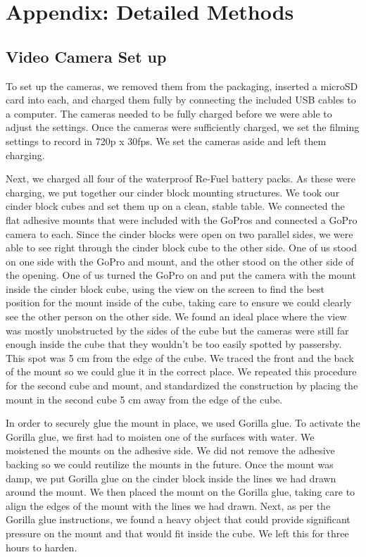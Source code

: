 \documentclass{article}\usepackage[]{graphicx}\usepackage[]{color}
\begin{document}



\newpage
\section{Appendix: Detailed Methods}

\subsection{Video Camera Set up}

To set up the cameras, we removed them from the packaging, inserted a microSD card into each, and charged them fully by connecting the included USB cables to a computer. The cameras needed to be fully charged before we were able to adjust the settings. Once the cameras were sufficiently charged, we set the filming settings to record in 720p x 30fps. We set the cameras aside and left them charging. 

Next, we charged all four of the waterproof Re-Fuel battery packs. As these were charging, we put together our cinder block mounting structures. We took our cinder block cubes and set them up on a clean, stable table. We connected the flat adhesive mounts that were included with the GoPros and connected a GoPro camera to each. Since the cinder blocks were open on two parallel sides, we were able to see right through the cinder block cube to the other side. One of us stood on one side with the GoPro and mount, and the other stood on the other side of the opening. One of us turned the GoPro on and put the camera with the mount inside the cinder block cube, using the view on the screen to find the best position for the mount inside of the cube, taking care to ensure we could clearly see the other person on the other side. We found an ideal place where the view was mostly unobstructed by the sides of the cube but the cameras were still far enough inside the cube that they wouldn't be too easily spotted by passersby. This spot was 5 cm from the edge of the cube. We traced the front and the back of the mount so we could glue it in the correct place. We repeated this procedure for the second cube and mount, and standardized the construction by placing the mount in the second cube 5 cm away from the edge of the cube. 

In order to securely glue the mount in place, we used Gorilla glue. To activate the Gorilla glue, we first had to moisten one of the surfaces with water. We moistened the mounts on the adhesive side. We did not remove the adhesive backing so we could reutilize the mounts in the future. Once the mount was damp, we put Gorilla glue on the cinder block inside the lines we had drawn around the mount. We then placed the mount on the Gorilla glue, taking care to align the edges of the mount with the lines we had drawn. Next, as per the Gorilla glue instructions, we found a heavy object that could provide significant pressure on the mount and that would fit inside the cube. We left this for three hours to harden.
\end{document}
